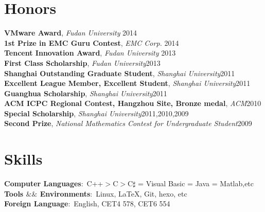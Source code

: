 \documentclass[margin]{res}
\begin{document}
\begin{resume}
\section{Honors}
\textbf{VMware Award}, \emph{Fudan University} \hfill2014\\
\textbf{1st Prize in EMC Guru Contest}, \emph{EMC Corp.} \hfill2014\\
\textbf{Tencent Innovation Award}, \emph{Fudan University} \hfill2013\\
\textbf{First Class Scholarship}, \emph{Fudan University}\hfill2013\\
\textbf{Shanghai Outstanding Graduate Student}, \emph{Shanghai University}\hfill 2011\\
\textbf{Excellent League Member, Excellent Student}, \emph{Shanghai University}\hfill 2011\\
\textbf{Guanghua Scholarship}, \emph{Shanghai University}\hfill 2011\\
\textbf{ACM ICPC Regional Contest, Hangzhou Site, Bronze medal}, \emph{ACM}\hfill 2010\\
\textbf{Special Scholarship}, \emph{Shanghai University}\hfill 2011,2010,2009\\
\textbf{Second Prize}, \emph{National Mathematics Contest for Undergraduate Student}\hfill 2009\\

\section{Skills}
\textbf{Computer Languages}:~C++$>$C$>$C$\sharp$ = Visual Basic = Java = Matlab,etc\\
\textbf{Tools $\&\&$ Environments}:~Linux, \LaTeX, Git, hexo, etc\\
\textbf{Foreign Language}:~English, CET4 578, CET6 554\\







\end{resume}
\end{document}
